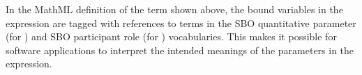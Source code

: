 In the MathML definition of the term shown above, the bound
variables in the  expression are tagged with
references to terms in the SBO quantitative parameter (for
) and SBO participant role (for ) vocabularies.
This makes it possible for software applications to interpret the
intended meanings of the parameters in the expression.










